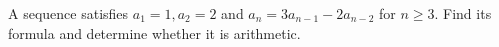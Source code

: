 A sequence satisfies $a_1=1,a_2=2$ and $a_n=3a_{n-1}-2a_{n-2}$ for $n\ge3$. Find its formula and determine whether it is arithmetic.
